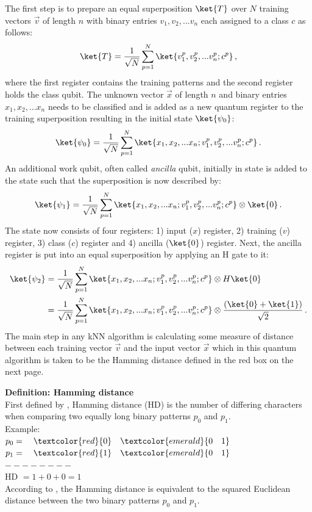 The first step is to prepare an equal superposition $\ket{T}$ over $N$ training vectors $\vec{v}$ of length $n$ with binary entries $v_1,v_2,...v_n$ each assigned to a class $c$ as follows:
\begin{equation}
\label{equ:qubitknninitial}
\ket{T} = \frac{1}{\sqrt{N}}\sum_{p=1}^N \ket{v_1^p,v_2^p,...v_n^p;c^p}\, ,
\end{equation}
where the first register contains the training patterns and the second register holds the class qubit. The unknown vector $\vec{x}$ of length $n$ and binary entries $x_1,x_2,...x_n$ needs to be classified and is added as a new quantum register to the training superposition resulting in the initial state $\ket{\psi_0}$:
\begin{equation}
\ket{\psi_0} = \frac{1}{\sqrt{N}}\sum_{p=1}^N \ket{x_1,x_2,...x_n;v_1^p,v_2^p,...v_n^p;c^p}\, .
\end{equation}
An additional work qubit, often called \emph{ancilla} qubit, initially in state \0 is added to the state such that the superposition is now described by:
\begin{equation}
\ket{\psi_1} = \frac{1}{\sqrt{N}}\sum_{p=1}^N \ket{x_1,x_2,...x_n;v_1^p,v_2^p,...v_n^p;c^p} \otimes \ket{0}\, .
\end{equation}
The state now consists of four registers: 1) input ($x$) register, 2) training ($v$) register, 3) class ($c$) register and 4) ancilla ($\ket{0}$) register. Next, the ancilla register is put into an equal superposition by applying an H gate to it:
\begin{align}
\ket{\psi_2} &= \frac{1}{\sqrt{N}}\sum_{p=1}^N \ket{x_1,x_2,...x_n;v_1^p,v_2^p,...v_n^p;c^p} \otimes H\ket{0}\notag\\
&= \frac{1}{\sqrt{N}}\sum_{p=1}^N \ket{x_1,x_2,...x_n;v_1^p,v_2^p,...v_n^p;c^p} \otimes \frac{(\ket{0}+\ket{1})}{\sqrt{2}}\, .
\end{align}
The main step in any kNN algorithm is calculating some measure of distance between each training vector $\vec{v}$ and the input vector $\vec{x}$ which in this quantum algorithm is taken to be the Hamming distance defined in the red box on the next page.

\begin{redbox}
\textbf{Definition: Hamming distance}\\
\newline
First defined by , Hamming distance (HD) is the number of differing characters when comparing two equally long binary patterns $p_0$ and $p_1$.\\
\newline
Example:\\
$p_0 = \quad\textcolor{red}{0}\quad\textcolor{emerald}{0\quad1}$\\
$p_1 = \quad\textcolor{red}{1}\quad\textcolor{emerald}{0\quad1}$\\
$--------$\\
HD $= 1+0+0 = 1$\\
\newline
According to , the Hamming distance is equivalent to the squared Euclidean distance between the two binary patterns $p_0$ and $p_1$.
\end{redbox}


